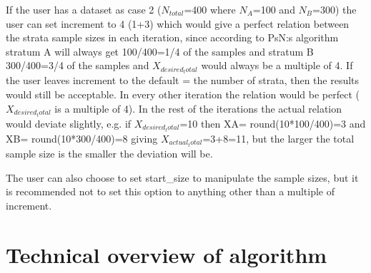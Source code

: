 If the user has a dataset as case 2 ($N_{total}$=400 where $N_A$=100 and $N_B$=300) the user can set increment to 4 (1+3) which would give a perfect relation between the strata sample sizes in each iteration, since according to PsN:s algorithm stratum A will always get 100/400=1/4 of the samples and stratum B 300/400=3/4 of the samples and $X_{desired_total}$ would always be a multiple of 4. If the user leaves increment to the default = the number of strata, then the results would still be acceptable. In every other iteration the relation would be perfect ( $X_{desired_total}$ is a multiple of 4). In the rest of the iterations the actual relation would deviate slightly, e.g. if $X_{desired_total}$=10 then XA= round(10*100/400)=3 and XB= round(10*300/400)=8 giving $X_{actual_total}$=3+8=11, but the larger the total sample size is the smaller the deviation will be. 

The user can also choose to set start\_size to manipulate the sample sizes, but it is recommended not to set this option to anything other than a multiple of increment.

\section{Technical overview of algorithm}

